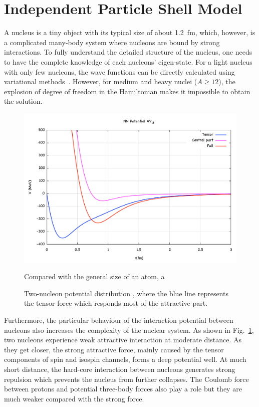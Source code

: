 \section{Independent Particle Shell Model}
A nucleus is a tiny object with its typical size of about 1.2~fm, which, however, is a complicated many-body system where nucleons are bound by strong interactions. To fully understand the detailed structure of the nucleus, one needs to have the complete knowledge of each nucleons' eigen-state. For a light nucleus with only few nucleons, the wave functions can be directly calculated using variational methods~\cite{PhysRevLett.87.172502}. However, for medium and heavy nuclei ($A\geq 12$), the explosion of degree of freedom in the Hamiltonian makes it impossible to obtain the solution.
\begin{figure}[!ht]
  \begin{center}
    \includegraphics[type=pdf,ext=.pdf,read=.pdf,width=0.60\linewidth]{./figures/physics/CentralTensorFull}
    \caption[Two-nucleon potential distribution]{\footnotesize{Two-nucleon potential distribution \cite{donal_prvt}, where the blue line represents the tensor force which responds most of the attractive part.}}
    \label{potential_well}Compared with the general size of an atom, a
  \end{center}
\end{figure}

Furthermore, the particular behaviour of the interaction potential between nucleons also increases the complexity of the nuclear system. As shown in Fig.~\ref{potential_well}, two nucleons experience weak attractive interaction at moderate distance. As they get closer, the strong attractive force, mainly caused by the tensor components of spin and isospin channels, forms a deep potential well. At much short distance, the hard-core interaction between nucleons generates strong repulsion which prevents the nucleus from further collapses. The Coulomb force between protons and potential three-body forces also play a role but they are much weaker compared with the strong force.

